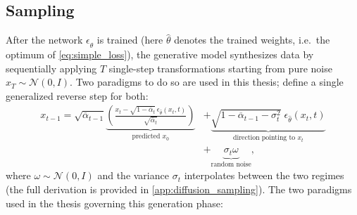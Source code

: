 \subsection{Sampling}
After the network $\epsilon_{\hat{\theta}}$ is trained (here $\hat{\theta}$ denotes the trained weights, i.e.\ the optimum of \autoref{eq:simple_loss}), the generative model synthesizes data by sequentially applying $T$ single-step transformations starting from pure noise $x_T \sim \mathcal{N}(0, I)$. Two paradigms to do so are used in this thesis; \textcite{song_denoising_2022} define a single generalized reverse step for both:
\begin{equation}
\label{eq:bg_generalized_sampling}
\begin{aligned}
    x_{t-1} = \sqrt{\overline{\alpha}_{t-1}} \underbrace{\left( \frac{x_t - \sqrt{1-\overline{\alpha}_t}\,\epsilon_{\hat{\theta}}(x_t, t)}{\sqrt{\overline{\alpha}_t}} \right)}_{\text{predicted } x_0}
    &+ \underbrace{\sqrt{1 - \overline{\alpha}_{t-1} - \sigma_t^2}\; \epsilon_{\hat{\theta}}(x_t, t)}_{\text{direction pointing to } x_t} \\
    &+ \underbrace{\sigma_t \omega}_{\text{random noise}},
\end{aligned}
\end{equation}
where $\omega \sim \mathcal{N}(0, I)$ and the variance $\sigma_t$ interpolates between the two regimes (the full derivation is provided in \autoref{app:diffusion_sampling}). The two paradigms used in the thesis governing this generation phase:


